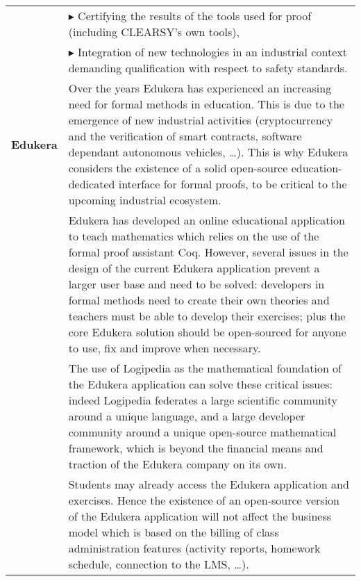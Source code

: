 \begin{longtable}{|p{}|p{}|}
& $\blacktriangleright$ Certifying the results of the tools used for
proof (including CLEARSY's own tools),\\


&
$\blacktriangleright$
  Integration of new technologies in an industrial context demanding qualification with respect to safety standards.
\\

\hline

{\bf Edukera}&

\hspace{0.4cm} Over the years Edukera has experienced an increasing
need for formal methods in education. This is due to the emergence of
new industrial activities (cryptocurrency and the verification of
smart contracts, software dependant autonomous vehicles, \ldots). This
is why Edukera considers the existence of a solid open-source
education-dedicated interface for formal proofs, to be critical to the
upcoming industrial ecosystem.\\

&Edukera has developed an online educational application
to teach mathematics which relies on the use of the formal proof
assistant Coq. However, several issues in the design of the current
Edukera application prevent a larger user base and need to be solved:
developers in formal methods need to create their own theories and
teachers must be able to develop their exercises; plus the core
Edukera solution should be open-sourced for anyone to use, fix and
improve when necessary.  \\

&
\hspace{0.4cm} The use of Logipedia as the mathematical foundation of
the Edukera application can solve these critical issues: indeed
Logipedia federates a large scientific community around a unique
language, and a large developer community around a unique open-source
mathematical framework, which is beyond the financial means and
traction of the Edukera company on its own.  \\

&
\hspace{0.4cm} Students may already access the Edukera application and
exercises. Hence the existence of an open-source version of the
Edukera application will not affect the business model which is based
on the billing of class administration features (activity reports,
homework schedule, connection to the LMS, \ldots).  \\


\end{longtable}
